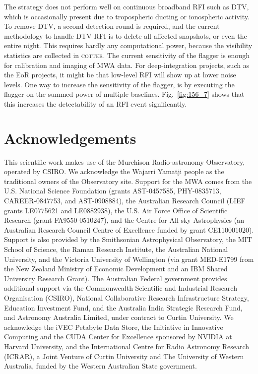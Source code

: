 \documentclass{pasa}
\DeclareRobustCommand{\TUSSEN}[3]{#2}
\begin{document}
The strategy does not perform well on continuous broadband RFI such as DTV, which is occasionally present due to tropospheric ducting or ionospheric activity. To remove DTV, a second detection round is required, and the current methodology to handle DTV RFI is to delete all affected snapshots, or even the entire night. This requires hardly any computational power, because the visibility statistics are collected in \textsc{cotter}. The current sensitivity of the flagger is enough for calibration and imaging of MWA data. For deep-integration projects, such as the EoR projects, it might be that low-level RFI will show up at lower noise levels. One way to increase the sensitivity of the flagger, is by executing the flagger on the summed power of multiple baselines. Fig.~\ref{fig:156_7} shows that this increases the detectability of an RFI event significantly.

\section*{Acknowledgements}
This scientific work makes use of the Murchison Radio-astronomy Observatory, operated by CSIRO. We acknowledge the Wajarri Yamatji people as the traditional owners of the Observatory site. Support for the MWA comes from the U.S. National Science Foundation (grants AST-0457585, PHY-0835713, CAREER-0847753, and AST-0908884), the Australian Research Council (LIEF grants LE0775621 and LE0882938), the U.S. Air Force Office of Scientific Research (grant FA9550-0510247), and the Centre for All-sky Astrophysics (an Australian Research Council Centre of Excellence funded by grant CE110001020). Support is also provided by the Smithsonian Astrophysical Observatory, the MIT School of Science, the Raman Research Institute, the Australian National University, and the Victoria University of Wellington (via grant MED-E1799 from the New Zealand Ministry of Economic Development and an IBM Shared University Research Grant). The Australian Federal government provides additional support via the Commonwealth Scientific and Industrial Research Organisation (CSIRO), National Collaborative Research Infrastructure Strategy, Education Investment Fund, and the Australia India Strategic Research Fund, and Astronomy Australia Limited, under contract to Curtin University. We acknowledge the iVEC Petabyte Data Store, the Initiative in Innovative Computing and the CUDA Center for Excellence sponsored by NVIDIA at Harvard University, and the International Centre for Radio Astronomy Research (ICRAR), a Joint Venture of Curtin University and The University of Western Australia, funded by the Western Australian State government. 

\DeclareRobustCommand{\TUSSEN}[3]{#3}



\label{lastpage}
\end{document}
